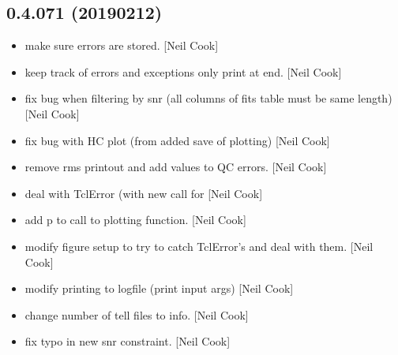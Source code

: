 \documentclass[a4paper,10pt,english]{report}
\begin{document}
\subsection{0.4.071 (2019\sphinxhyphen{}02\sphinxhyphen{}12)}
\label{\detokenize{misc/changelog:id206}}\begin{itemize}
\item {} 
 \sphinxhyphen{} make sure  errors are stored. {[}Neil
Cook{]}

\item {} 
 \sphinxhyphen{} keep track of errors and exceptions \sphinxhyphen{} only print
at end. {[}Neil Cook{]}

\item {} 
 \sphinxhyphen{} fix bug when filtering by snr (all columns of
fits table must be same length) {[}Neil Cook{]}

\item {} 
 \sphinxhyphen{} fix bug with HC plot (from added save of plotting)
{[}Neil Cook{]}

\item {} 
 \sphinxhyphen{} remove rms printout and add values to QC
errors. {[}Neil Cook{]}

\item {} 
 \sphinxhyphen{} deal with TclError (with new call for 
{[}Neil Cook{]}

\item {} 
 \sphinxhyphen{} add p to call to plotting function. {[}Neil
Cook{]}

\item {} 
 \sphinxhyphen{} modify figure setup to try to catch TclError’s and
deal with them. {[}Neil Cook{]}

\item {} 
 \sphinxhyphen{} modify printing to logfile (print input args)
{[}Neil Cook{]}

\item {} 
 \sphinxhyphen{} change number of tell files to info. {[}Neil
Cook{]}

\item {} 
 \sphinxhyphen{} fix typo in new snr constraint. {[}Neil Cook{]}


\end{itemize}
\end{document}
